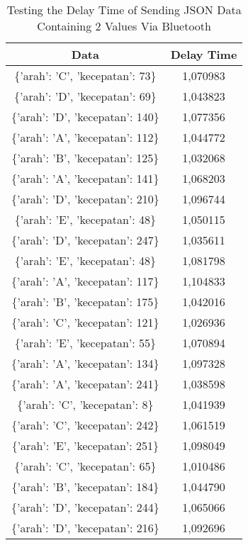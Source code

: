 \begin{table}[!h]
\centering
  \caption{Testing the Delay Time of Sending JSON Data Containing 2 Values Via Bluetooth}
  \label{tbl:delayBluetoothJSON2}
  \begin{tabular}{|c|c|}
  \hline
  Data                              & Delay Time  \\ \hline
  \{'arah': 'C', 'kecepatan': 73\}  & 1,070983    \\ \hline
  \{'arah': 'D', 'kecepatan': 69\}  & 1,043823    \\ \hline
  \{'arah': 'D', 'kecepatan': 140\} & 1,077356    \\ \hline
  \{'arah': 'A', 'kecepatan': 112\} & 1,044772    \\ \hline
  \{'arah': 'B', 'kecepatan': 125\} & 1,032068    \\ \hline
  \{'arah': 'A', 'kecepatan': 141\} & 1,068203    \\ \hline
  \{'arah': 'D', 'kecepatan': 210\} & 1,096744    \\ \hline
  \{'arah': 'E', 'kecepatan': 48\}  & 1,050115    \\ \hline
  \{'arah': 'D', 'kecepatan': 247\} & 1,035611    \\ \hline
  \{'arah': 'E', 'kecepatan': 48\}  & 1,081798    \\ \hline
  \{'arah': 'A', 'kecepatan': 117\} & 1,104833    \\ \hline
  \{'arah': 'B', 'kecepatan': 175\} & 1,042016    \\ \hline
  \{'arah': 'C', 'kecepatan': 121\} & 1,026936    \\ \hline
  \{'arah': 'E', 'kecepatan': 55\}  & 1,070894    \\ \hline
  \{'arah': 'A', 'kecepatan': 134\} & 1,097328    \\ \hline
  \{'arah': 'A', 'kecepatan': 241\} & 1,038598    \\ \hline
  \{'arah': 'C', 'kecepatan': 8\}   & 1,041939    \\ \hline
  \{'arah': 'C', 'kecepatan': 242\} & 1,061519    \\ \hline
  \{'arah': 'E', 'kecepatan': 251\} & 1,098049    \\ \hline
  \{'arah': 'C', 'kecepatan': 65\}  & 1,010486    \\ \hline
  \{'arah': 'B', 'kecepatan': 184\} & 1,044790    \\ \hline
  \{'arah': 'D', 'kecepatan': 244\} & 1,065066    \\ \hline
  \{'arah': 'D', 'kecepatan': 216\} & 1,092696    \\ \hline

\end{tabular}
\end{table}

